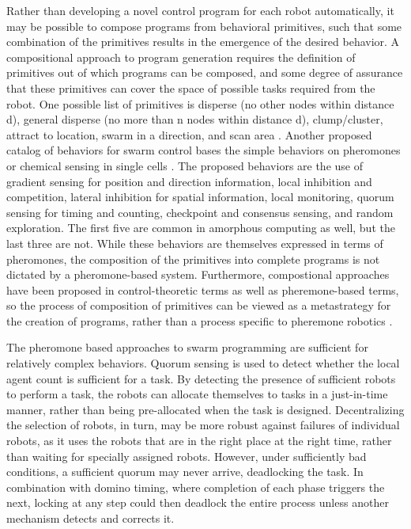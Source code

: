 Rather than developing a novel control program for each robot automatically, it may be possible to compose programs from behavioral primitives, such that some combination of the primitives results in the emergence of the desired behavior. 
A compositional approach to program generation requires the definition of primitives out of which programs can be composed, and some degree of assurance that these primitives can cover the space of possible tasks required from the robot. 
One possible list of primitives is disperse (no other nodes within distance d), general disperse (no more than n nodes within distance d), clump/cluster, attract to location, swarm in a direction, and scan area \citep{evans2000programming}.
Another proposed catalog of behaviors for swarm control bases the simple behaviors on pheromones or chemical sensing in single cells \citep{nagpal2004catalog}. 
The proposed behaviors are the use of gradient sensing for position and direction information, local inhibition and competition, lateral inhibition for spatial information, local monitoring, quorum sensing for timing and counting, checkpoint and consensus sensing, and random exploration. 
The first five are common in amorphous computing as well, but the last three are not. %
While these behaviors are themselves expressed in terms of pheromones, the composition of the primitives into complete programs is not dictated by a pheromone-based system.
Furthermore, compostional approaches have been proposed in control-theoretic terms as well as pheremone-based terms, so the process of composition of primitives can be viewed as a metastrategy for the creation of programs, rather than a process specific to pheremone robotics \citep{belta2007symbolic}.

The pheromone based approaches to swarm programming are sufficient for relatively complex behaviors. 
Quorum sensing is used to detect whether the local agent count is sufficient for a task. 
By detecting the presence of sufficient robots to perform a task, the robots can allocate themselves to tasks in a just-in-time manner, rather than being pre-allocated when the task is designed. 
Decentralizing the selection of robots, in turn, may be more robust against failures of individual robots, as it uses the robots that are in the right place at the right time, rather than waiting for specially assigned robots. 
However, under sufficiently bad conditions, a sufficient quorum may never arrive, deadlocking the task. 
In combination with domino timing, where completion of each phase triggers the next, locking at any step could then deadlock the entire process unless another mechanism detects and corrects it.


